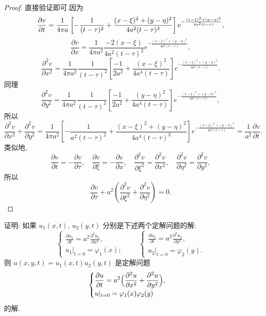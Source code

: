 \begin{proof}
	直接验证即可.因为
	$$\frac{\partial v}{\partial t}=\frac{1}{4\pi a}\left[-\frac{1}{(t-\tau)^{2}}+\frac{(x-\xi)^{2}+(y-\eta)^{2}}{4a^{2}(t-\tau)^{3}}\right]\mathrm{e}^{-\frac{(x-\xi)^{2}+(y-\eta)^{2}}{4a^{2}(t-\tau)}},$$
	$$\frac{\partial v}{\partial x}=\frac{1}{4\pi a^{2}}\frac{-2(x-\xi)}{4a^{2}(t-\tau)^{2}}e^{-\frac{(x-\xi)^{2}+(y-\eta)^{2}}{4a^{2}(t-\tau)}},$$
	$$\frac{\partial^{2}v}{\partial x^{2}}=\frac{1}{4\pi a^{2}}\frac{1}{(t-\tau)^{2}}\left[\frac{-1}{2a^{2}}+\frac{(x-\xi)^{2}}{4a^{4}(t-\tau)}\right]e^{-\frac{(x-\xi)^{2}+(y-\eta)^{2}}{4a^{2}(t-\tau)}}.$$
	同理
	$$\frac{\partial^2v}{\partial y^2}=\frac{1}{4\pi a^2}\frac{1}{(t-\tau)^2}\left[\frac{-1}{2a^2}+\frac{(y-\eta)^2}{4a^4(t-\tau)}\right]e^{-\frac{(x-\xi)^2+(y-\eta)^2}{4a^2(t-\tau)}},$$
	所以
	$$\frac{\partial^2v}{\partial x^2}+\frac{\partial^2v}{\partial y^2}=\frac{1}{4\pi a^2}\left[-\frac{1}{a^2(t-\tau)^2}+\frac{(x-\xi)^2+(y-\eta)^2}{4a^4(t-\tau)^3}\right]e^{-\frac{(x-\xi)^2+(y-\eta)^2}{4a^2(t-\tau)}}=\frac{1}{a^2}\frac{\partial v}{\partial t}.$$
	类似地,
	$$\dfrac{\partial v}{\partial t}=-\dfrac{\partial v}{\partial\tau},\quad\dfrac{\partial v}{\partial\xi}=-\dfrac{\partial v}{\partial x},\quad\dfrac{\partial^2v}{\partial\xi^2}=\dfrac{\partial^2v}{\partial x^2},\quad\dfrac{\partial^2v}{\partial\eta^2}=\dfrac{\partial^2v}{\partial y^2},$$
	所以
	$$\frac{\partial v}{\partial\tau}+a^2\left(\frac{\partial^2v}{\partial\xi^2}+\frac{\partial^2v}{\partial\eta^2}\right)=0.$$
\end{proof}
\begin{exercise}[7]
  证明: 如果 $u_1(x,t)$, $u_2(y,t)$ 分别是下述两个定解问题的解:
  \[\begin{cases}
    \displaystyle\frac{\partial u_1}{\partial t} = a^2 \frac{\partial^2u_1}{\partial x^2}, \\
    u_1|_{t=0} = \varphi_1(x);
  \end{cases}
  \qquad
  \begin{cases}
    \displaystyle\frac{\partial u_2}{\partial t} = a^2 \frac{\partial^2u_2}{\partial y^2}, \\
    u_2|_{t=0} = \varphi_2(y).
  \end{cases}\]
  则 $u(x,y,t) = u_1(x,t)u_2(y,t)$ 是定解问题
  \[\begin{cases}
    \displaystyle\frac{\partial u}{\partial t} = 
      a^2\Bigl(\frac{\partial^2u}{\partial x^2} + \frac{\partial^2u}{\partial y^2}\Bigr), \\
    u|_{t=0} = \varphi_1(x) \varphi_2(y)
  \end{cases}\]
  的解.
\end{exercise}

